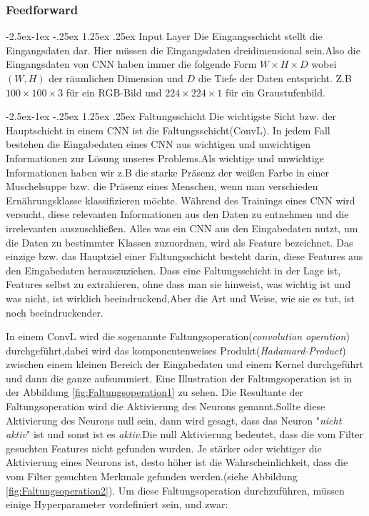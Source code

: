 \documentclass[12pt,a4paper]{scrartcl}
\makeatletter
\numberwithin{equation}{section}
\renewcommand\paragraph{\@startsection{paragraph}{4}{\z@}%
	{-2.5ex\@plus -1ex \@minus -.25ex}%
	{1.25ex \@plus .25ex}%
	{\normalfont\normalsize\bfseries}}
\makeatother
\begin{document}
\subsubsection{Feedforward }
\paragraph{Input Layer}\label{InputLayer}
Die Eingangsschicht stellt die Eingangsdaten dar. Hier müssen die Eingangsdaten dreidimensional sein.Also die Eingangsdaten von \ac{CNN}  haben immer die folgende Form $ W\times H\times D $ wobei $ (W, H) $ der räumlichen Dimension und $ D $ die Tiefe der Daten entspricht. Z.B  $ 100\times100 \times3 $ für ein RGB-Bild und $ 224\times224\times1 $ für ein Graustufenbild.


\paragraph{Faltungsschicht}\label{ConvL}
Die wichtigste Sicht bzw. der Hauptschicht in einem \ac{CNN} ist die Faltungsschicht(\ac{ConvL}).
In jedem Fall bestehen die Eingabedaten eines \ac{CNN} aus wichtigen und unwichtigen Informationen zur Lösung unseres Problems.Als wichtige und unwichtige Informationen haben wir z.B die starke Präsenz der weißen Farbe in einer Muschelsuppe bzw. die Präsenz eines Menschen, wenn man verschieden Ernährungsklasse klassifizieren möchte. Während des Trainings eines \ac{CNN} wird versucht, diese relevanten Informationen aus den Daten zu entnehmen und die irrelevanten auszuschließen. Alles was ein \ac{CNN} aus den Eingabedaten nutzt, um die Daten zu bestimmter Klassen zuzuordnen, wird als Feature bezeichnet.
Das einzige bzw. das Hauptziel einer Faltungsschicht besteht darin, diese Features aus den Eingabedaten herauszuziehen.
Dass eine Faltungsschicht in der Lage ist, Features selbst zu extrahieren, ohne dass man sie hinweist, was wichtig ist und was nicht, ist wirklich beeindruckend,Aber die Art und Weise, wie sie es tut, ist noch beeindruckender.

In einem \ac{ConvL} wird die sogenannte Faltungsoperation(\emph{convolution operation}) durchgeführt,dabei wird das komponentenweises Produkt(\textit{Hadamard-Product}) zwischen einem kleinen Bereich der Eingabedaten und einem Kernel durchgeführt und dann die ganze aufsummiert. Eine Illustration der Faltungsoperation ist in der Abbildung \ref{fig:Faltungsoperation1} zu sehen. Die Resultante der Faltungsoperation wird die Aktivierung des Neurons genannt.Sollte diese Aktivierung des Neurons null sein, dann wird gesagt, dass das Neuron "\textit{nicht aktiv}"{} ist und sonst ist es \textit{aktiv}.Die null Aktivierung bedeutet, dass die vom Filter gesuchten Features nicht gefunden wurden. Je stärker oder wichtiger die Aktivierung eines Neurons ist, desto höher ist die Wahrscheinlichkeit, dass die vom Filter gesuchten Merkmale gefunden werden.(siehe Abbildung \ref{fig:Faltungsoperation2}).
Um diese Faltungsoperation durchzuführen, müssen einige Hyperparameter vordefiniert sein, und zwar:
\end{document}
